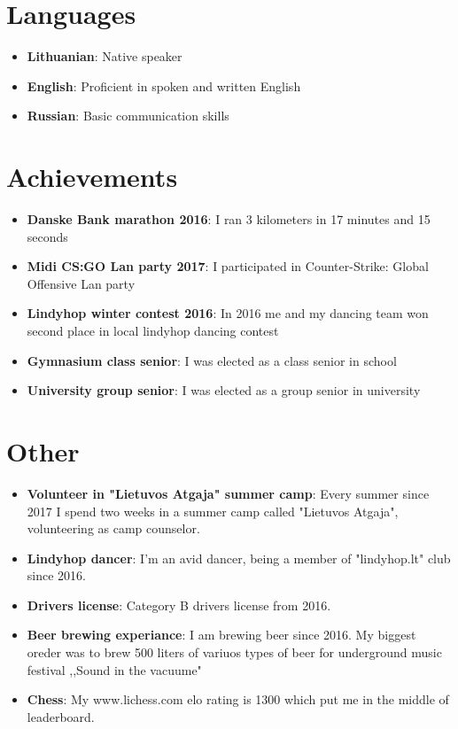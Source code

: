 \documentclass[letterpaper,11pt]{article}
\newcommand{\resumeItem}[2]{
  \item\small{
    \textbf{#1}{: #2 \vspace{-2pt}}
  }
}
\newcommand{\resumeSubItem}[2]{\resumeItem{#1}{#2}\vspace{-4pt}}
\newcommand{\resumeSubHeadingListStart}{\begin{itemize}[leftmargin=*]}
\newcommand{\resumeSubHeadingListEnd}{\end{itemize}}
\begin{document}
\section{Languages}
  \resumeSubHeadingListStart
    \item{
      \textbf{Lithuanian}{: Native speaker}
      \hfill
    }
    \item{
	\textbf{English}{: Proficient in spoken and written English}
	\hfil
	}

    \item{
	\textbf{Russian}{: Basic communication skills}
	\hfil
	}
  \resumeSubHeadingListEnd

\section{Achievements}
  \resumeSubHeadingListStart
    \item{
      \textbf{Danske Bank marathon 2016}{: I ran 3 kilometers in 17 minutes and 15 seconds}
      \hfill
    }
    \item{
	\textbf{Midi CS:GO Lan party 2017}{: I participated in Counter-Strike: Global Offensive Lan party}
	\hfil
	}
    \item{
	\textbf{Lindyhop winter contest 2016}{: In 2016 me and my dancing team won second place in local lindyhop dancing contest}
	\hfil
	}
    \item{
	\textbf{Gymnasium class senior}{: I was elected as a class senior in school}
	\hfil
	}
    \item{
	\textbf{University group senior}{: I was elected as a group senior in university}
	\hfil
	}



  \resumeSubHeadingListEnd

\section{Other}
  \resumeSubHeadingListStart
    \resumeSubItem{Volunteer in "Lietuvos Atgaja" summer camp}
      {Every summer since 2017 I spend two weeks in a  summer camp called "Lietuvos Atgaja", volunteering as camp counselor.}
        \resumeSubItem{Lindyhop dancer}
      {I'm an avid dancer, being a member of "lindyhop.lt" club since 2016.}
    \resumeSubItem{Drivers license}
      {Category B drivers license from 2016.}
    \resumeSubItem{Beer brewing experiance}
      {I am brewing beer since 2016. My biggest oreder was to brew 500 liters of variuos types of beer for underground music festival ,,Sound in the vacuume"}
    \resumeSubItem{Chess}
      {My www.lichess.com elo rating is 1300 which put me in the middle of leaderboard.
}   
  \resumeSubHeadingListEnd
\end{document}
